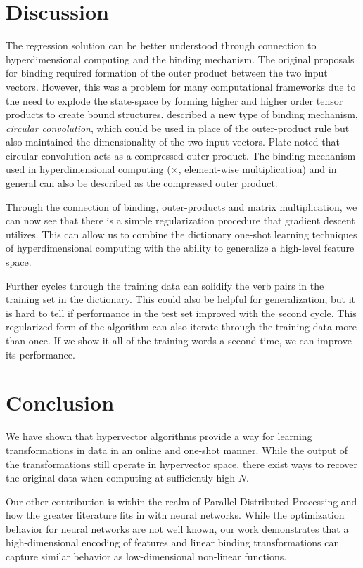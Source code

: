 \documentclass{article}
\begin{document}
\section{Discussion}
The regression solution can be better understood through connection to hyperdimensional computing and the binding mechanism. The original proposals for binding \citet{Smolensky1990} required formation of the outer product between the two input vectors. However, this was a problem for many computational frameworks due to the need to explode the state-space by forming higher and higher order tensor products to create bound structures. \citet{Plate1991} described a new type of binding mechanism, \emph{circular convolution}, which could be used in place of the outer-product rule but also maintained the dimensionality of the two input vectors. Plate noted that circular convolution acts as a compressed outer product. The binding mechanism used in hyperdimensional computing ($\times$, element-wise multiplication) and in general can also be described as the compressed outer product. 

Through the connection of binding, outer-products and matrix multiplication, we can now see that there is a simple regularization procedure that gradient descent utilizes. This can allow us to combine the dictionary one-shot learning techniques of hyperdimensional computing with the ability to generalize a high-level feature space. 

Further cycles through the training data can solidify the verb pairs in the training set in the dictionary. This could also be helpful for generalization, but it is hard to tell if performance in the test set improved with the second cycle.  This regularized form of the algorithm can also iterate through the training data more than once. If we show it all of the training words a second time, we can improve its performance.

\section{Conclusion}
We have shown that hypervector algorithms provide a way for learning transformations in data in an online and one-shot manner. While the output of the transformations still operate in hypervector space, there exist ways to recover the original data when computing at sufficiently high $N$. 

Our other contribution is within the realm of Parallel Distributed Processing and how the greater literature fits in with neural networks. While the optimization behavior for neural networks are not well known, our work demonstrates that a high-dimensional encoding of features and linear binding transformations can capture similar behavior as low-dimensional non-linear functions. 
\end{document}
